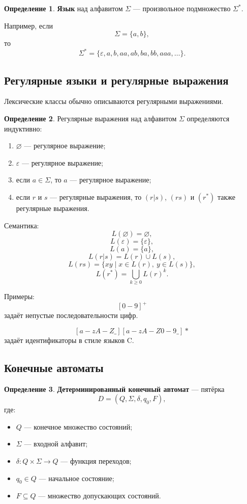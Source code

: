 \documentclass[12pt,a4paper]{article}
\theoremstyle{definition}
\newtheorem{definition}{Определение}
\theoremstyle{plain}
\begin{document}
\begin{definition}
\textbf{Язык} над алфавитом $\Sigma$ --- произвольное подмножество $\Sigma^*$.
\end{definition}

Например, если
\[
\Sigma = \{a,b\},
\]
то
\[
\Sigma^* = \{\varepsilon, a, b, aa, ab, ba, bb, aaa, \ldots\}.
\]

\subsection{Регулярные языки и регулярные выражения}

Лексические классы обычно описываются регулярными выражениями.

\begin{definition}
Регулярные выражения над алфавитом $\Sigma$ определяются индуктивно:
\begin{enumerate}
    \item $\varnothing$ --- регулярное выражение;
    \item $\varepsilon$ --- регулярное выражение;
    \item если $a \in \Sigma$, то $a$ --- регулярное выражение;
    \item если $r$ и $s$ --- регулярные выражения, то $(r|s)$, $(rs)$ и $(r^*)$ также регулярные выражения.
\end{enumerate}
\end{definition}

Семантика:
\[
L(\varnothing)=\varnothing,
\]
\[
L(\varepsilon)=\{\varepsilon\},
\]
\[
L(a)=\{a\},
\]
\[
L(r|s)=L(r)\cup L(s),
\]
\[
L(rs)=\{xy \mid x\in L(r),\ y\in L(s)\},
\]
\[
L(r^*)=\bigcup_{k\geq 0} L(r)^k.
\]

Примеры:
\[
[0-9]^+
\]
задаёт непустые последовательности цифр.

\[
[a-zA-Z\_][a-zA-Z0-9\_]*
\]
задаёт идентификаторы в стиле языков C.

\subsection{Конечные автоматы}

\begin{definition}
\textbf{Детерминированный конечный автомат} --- пятёрка
\[
D = (Q,\Sigma,\delta,q_0,F),
\]
где:
\begin{itemize}
    \item $Q$ --- конечное множество состояний;
    \item $\Sigma$ --- входной алфавит;
    \item $\delta: Q \times \Sigma \to Q$ --- функция переходов;
    \item $q_0\in Q$ --- начальное состояние;
    \item $F\subseteq Q$ --- множество допускающих состояний.
\end{itemize}
\end{definition}
\end{document}
